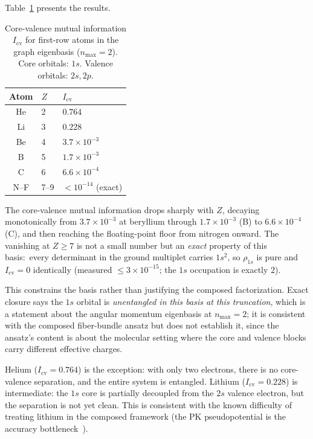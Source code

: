 \documentclass[twocolumn,pra,amsmath,amssymb,superscriptaddress]{revtex4-2}
\begin{document}
Table~\ref{tab:corevalence} presents the results.

\begin{table}
\caption{Core-valence mutual information $I_{\text{cv}}$ for
first-row atoms in the graph eigenbasis ($n_{\max} = 2$).  Core
orbitals: $1s$.  Valence orbitals: $2s, 2p$.
\label{tab:corevalence}}
\begin{ruledtabular}
\begin{tabular}{cll}
Atom & $Z$ & $I_{\text{cv}}$ \\
\hline
He & 2 & $0.764$ \\
Li & 3 & $0.228$ \\
Be & 4 & $3.7\times10^{-3}$ \\
B  & 5 & $1.7\times10^{-3}$ \\
C  & 6 & $6.6\times10^{-4}$ \\
N--F & 7--9 & $< 10^{-14}$ (exact) \\
\end{tabular}
\end{ruledtabular}
\end{table}

The core-valence mutual information drops sharply with $Z$, decaying
monotonically from $3.7\times10^{-3}$ at beryllium through
$1.7\times10^{-3}$ (B) to $6.6\times10^{-4}$ (C), and then reaching
the floating-point floor from nitrogen onward.  The vanishing at
$Z \geq 7$ is not a small number but an \emph{exact} property of this
basis:\ every determinant in the ground multiplet carries $1s^2$, so
$\rho_{1s}$ is pure and $I_{\text{cv}} = 0$ identically (measured
$\le 3\times10^{-15}$; the $1s$ occupation is exactly $2$).

This constrains the basis rather than justifying the composed
factorization.  Exact closure says the $1s$ orbital is
\emph{unentangled in this basis at this truncation}, which is a
statement about the angular momentum eigenbasis at $n_{\max} = 2$; it
is consistent with the composed fiber-bundle ansatz but does not
establish it, since the ansatz's content is about the molecular
setting where the core and valence blocks carry different effective
charges.

Helium ($I_{\text{cv}} = 0.764$) is the exception: with only two
electrons, there is no core-valence separation, and the entire
system is entangled.  Lithium ($I_{\text{cv}} = 0.228$) is
intermediate: the $1s$ core is partially decoupled from the $2s$
valence electron, but the separation is not yet clean.  This is
consistent with the known difficulty of treating lithium in the
composed framework (the PK pseudopotential is the accuracy
bottleneck~\cite{GeoVac_Paper17}).
\end{document}
